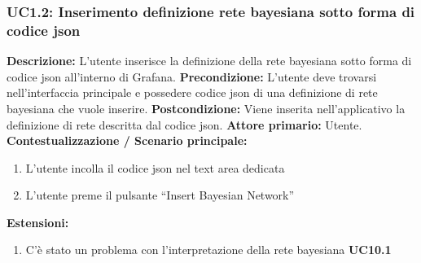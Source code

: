                \subsubsection{UC1.2: Inserimento definizione rete bayesiana sotto forma di codice json}
                	\textbf{Descrizione:} L'utente inserisce la definizione della rete bayesiana sotto forma di codice json all'interno di Grafana.
                    \textbf{Precondizione:}  L’utente deve trovarsi nell’interfaccia principale e possedere codice json di una definizione di rete bayesiana che vuole inserire.
                    \newline
                    \textbf{Postcondizione:} Viene inserita nell’applicativo la definizione di rete descritta dal codice json.
                    \newline
                    \textbf{Attore primario:} Utente.
                    \newline
                    \textbf{Contestualizzazione / Scenario principale:} \begin{enumerate}
                        \item L’utente incolla il codice json nel text area dedicata
                        \item L’utente preme il pulsante “Insert Bayesian Network”
                    \end{enumerate}
                    
                    \textbf{Estensioni:} \begin{enumerate}
                            \item C’è stato un problema con l’interpretazione della rete bayesiana \textbf{UC10.1}
                        \end{enumerate}
                        
